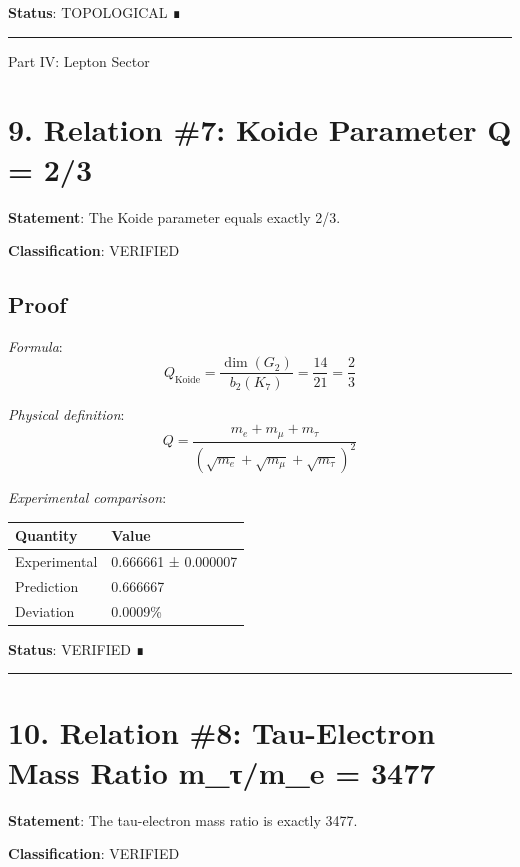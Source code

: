 \documentclass[11pt,a4paper]{article}
\begin{document}
\textbf{Status}: TOPOLOGICAL ∎

\begin{center}\rule{\linewidth}{0.5pt}\end{center}

Part IV: Lepton Sector

\section{9. Relation \#7: Koide Parameter Q = 2/3}\label{relation-7-koide-parameter-q-23}

\textbf{Statement}: The Koide parameter equals exactly 2/3.

\textbf{Classification}: VERIFIED

\subsection{Proof}\label{proof-5}

\emph{Formula}: \[Q_{\text{Koide}} = \frac{\dim(G_2)}{b_2(K_7)} = \frac{14}{21} = \frac{2}{3}\]

\emph{Physical definition}: \[Q = \frac{m_e + m_\mu + m_\tau}{(\sqrt{m_e} + \sqrt{m_\mu} + \sqrt{m_\tau})^2}\]

\emph{Experimental comparison}:

\begin{longtable}[]{@{}ll@{}}
\toprule\noalign{}
Quantity & Value \\
\midrule\noalign{}
\endhead
\bottomrule\noalign{}
\endlastfoot
Experimental & 0.666661 ± 0.000007 \\
Prediction & 0.666667 \\
Deviation & 0.0009\% \\
\end{longtable}

\textbf{Status}: VERIFIED ∎

\begin{center}\rule{\linewidth}{0.5pt}\end{center}

\section{10. Relation \#8: Tau-Electron Mass Ratio m\_\allowbreak{}τ/m\_\allowbreak{}e = 3477}\label{relation-8-tau-electron-mass-ratio-m_ux3c4m_e-3477}

\textbf{Statement}: The tau-electron mass ratio is exactly 3477.

\textbf{Classification}: VERIFIED
\end{document}
